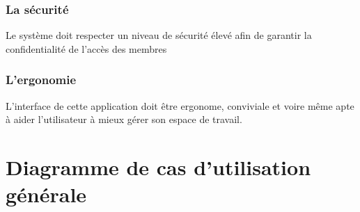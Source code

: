 \subsubsection{La s\'{e}curit\'{e}}

Le syst\`{e}me doit respecter un niveau de s\'{e}curit\'{e} \'{e}lev\'{e} afin de garantir la
confidentialit\'{e} de l'acc\`{e}s des membres

\subsubsection{L'ergonomie }

L'interface de cette application doit \^{e}tre ergonome, conviviale et voire m\^{e}me
apte \`{a} aider l'utilisateur \`{a} mieux g\'{e}rer son espace de travail.






\section{ Diagramme de cas d'utilisation g\'{e}n\'{e}rale }








%


